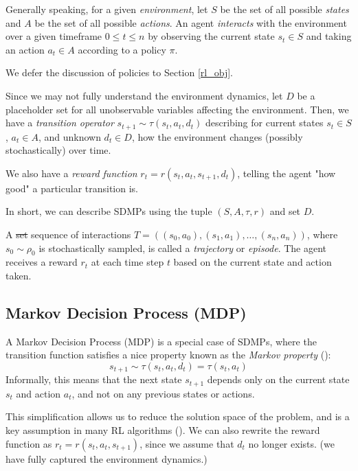 \documentclass{article} %
\begin{document}
Generally speaking, for a given \textit{environment}, let $S$ be the set of all possible \textit{states}
and $A$ be the set of all possible \textit{actions}. An agent \textit{interacts} with the environment over a given timeframe 
$0 \leq t \leq n$ by observing the current state $s_t \in S$ and taking an action $a_t \in A$ according to a policy $\pi$.

We defer the discussion of policies to Section \ref{rl_obj}.

Since we may not fully understand the environment dynamics, 
let $D$ be a placeholder set for all unobservable variables affecting the environment.
Then, we have a \textit{transition operator} $s_{t+1} \sim \tau(s_t, a_t, d_t)$ 
describing for current states $s_t \in S$, $a_t \in A$, and unknown $d_t \in D$,
how the environment changes (possibly stochastically) over time.

We also have a \textit{reward function} $r_t = r(s_t, a_t, s_{t + 1}, d_t)$, 
telling the agent "how good" a particular transition is.

In short, we can describe SDMPs using the tuple $(S, A, \tau, r)$ and set $D$.

A \st{set} {\color{red} sequence} of interactions $T = ((s_0, a_0), (s_1, a_1), \ldots, (s_n, a_n))$, where $s_0 \sim \rho_0$ is stochastically sampled, is called a \textit{trajectory} or \textit{episode}. 
The agent receives a reward $r_t$ at each time step $t$ based on the current state and action taken.

\subsection{Markov Decision Process (MDP)}
A Markov Decision Process (MDP) is a special case of SDMPs, where the transition function satisfies
a nice property known as the \textit{Markov property} (\cite{Sutton-and-Barto-1998}):
\begin{equation} \label{markov_property}
    s_{t+1} \sim \tau(s_t, a_t, d_t) = \tau(s_t, a_t)
\end{equation}
Informally, this means that the next state $s_{t+1}$ depends only on the current state $s_t$ and action $a_t$, and not on any previous states or actions.

This simplification allows us to reduce the solution space of the problem, and is a key assumption in many RL algorithms (\cite{Sutton-and-Barto-1998}).
We can also rewrite the reward function as $r_t = r(s_t, a_t, s_{t + 1})$, 
since we assume that $d_t$ no longer exists. (we have fully captured the environment dynamics.)
\end{document}
